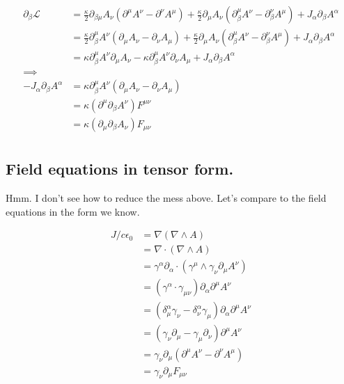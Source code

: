 \documentclass{article}
\newcommand{\LL}[0]{\mathcal{L}}
\newcommand{\grad}[0]{\nabla}
\begin{document}
\begin{align*}
\partial_{\beta} \LL 
&= 
\frac{\kappa}{2}
\partial_{\beta\mu} A_{\nu} ( \partial^{\mu} A^{\nu} - \partial^{\nu} A^{\mu} )
+ \frac{\kappa}{2}
\partial_{\mu} A_{\nu} ( \partial_{\beta}^{\mu} A^{\nu} - \partial_{\beta}^{\nu} A^{\mu} )
+ J_{\alpha} \partial_{\beta}A^{\alpha} \\
&= 
\frac{\kappa}{2} \partial_{\beta}^{\mu} A^{\nu} ( \partial_{\mu} A_{\nu} - \partial_{\nu} A_{\mu} )
+ \frac{\kappa}{2} \partial_{\mu} A_{\nu} ( \partial_{\beta}^{\mu} A^{\nu} - \partial_{\beta}^{\nu} A^{\mu} )
+ J_{\alpha} \partial_{\beta}A^{\alpha} \\
&= 
{\kappa} \partial_{\beta}^{\mu} A^{\nu} \partial_{\mu} A_{\nu}
- {\kappa} \partial_{\beta}^{\mu} A^{\nu} \partial_{\nu} A_{\mu}
+ J_{\alpha} \partial_{\beta}A^{\alpha} \\
\implies \\
-J_{\alpha} \partial_{\beta}A^{\alpha} 
&= {\kappa} \partial_{\beta}^{\mu} A^{\nu} \left( \partial_{\mu} A_{\nu} - \partial_{\nu} A_{\mu} \right) \\
&= {\kappa} (\partial^{\mu} \partial_{\beta}A^{\nu} ) F^{\mu\nu} \\
&= {\kappa} (\partial_{\mu} \partial_{\beta}A_{\nu} ) F_{\mu\nu} \\
\end{align*}

\subsection{ Field equations in tensor form. }

Hmm.  I don't see how to reduce the mess above.  Let's compare to the field equations in the form we know.

\begin{align*}
J/c \epsilon_0 
&= \grad (\grad \wedge A) \\
&= \grad \cdot ( \grad \wedge A ) \\
&= \gamma^{\alpha} \partial_{\alpha} \cdot ( \gamma^{\mu} \wedge \gamma_{\nu} \partial_{\mu} A^{\nu} ) \\
&= (\gamma^{\alpha} \cdot \gamma_{\mu\nu}) \partial_{\alpha} \partial^{\mu} A^{\nu} \\
&= (
\delta^{\alpha}_{\mu} \gamma_{\nu}
-\delta^{\alpha}_{\nu} \gamma_{\mu}
) \partial_{\alpha} \partial^{\mu} A^{\nu} \\
&= ( \gamma_{\nu} \partial_{\mu} - \gamma_{\mu} \partial_{\nu} ) \partial^{\mu} A^{\nu} \\
&= \gamma_{\nu} \partial_{\mu} (\partial^{\mu} A^{\nu} -\partial^{\nu} A^{\mu} ) \\
&= \gamma_{\nu} \partial_{\mu} F_{\mu\nu}
\end{align*}
\end{document}
